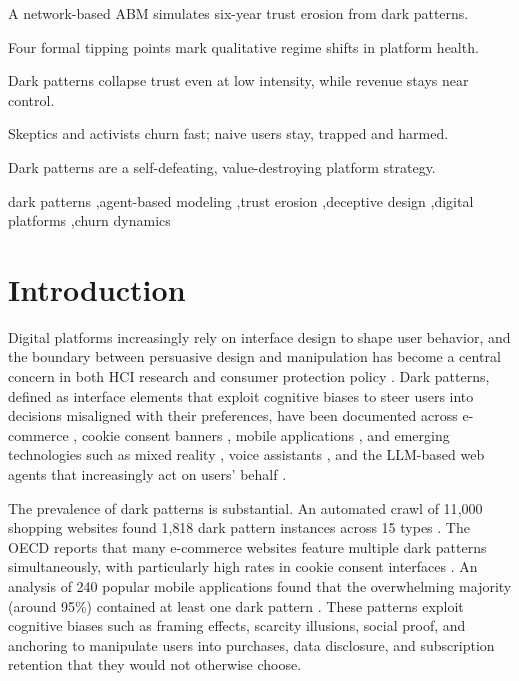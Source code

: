 \documentclass[a4paper,fleqn]{cas-sc}
\begin{document}
\begin{highlights}
\item A network-based ABM simulates six-year trust erosion from dark patterns.
\item Four formal tipping points mark qualitative regime shifts in platform health.
\item Dark patterns collapse trust even at low intensity, while revenue stays near control.
\item Skeptics and activists churn fast; naive users stay, trapped and harmed.
\item Dark patterns are a self-defeating, value-destroying platform strategy.
\end{highlights}

\begin{keywords}
dark patterns \sep agent-based modeling \sep trust erosion \sep deceptive design \sep digital platforms \sep churn dynamics
\end{keywords}

\maketitle

\section{Introduction}
Digital platforms increasingly rely on interface design to shape user behavior, and the boundary between persuasive design and manipulation has become a central concern in both HCI research and consumer protection policy \citep{gray2018,yi2025}. Dark patterns, defined as interface elements that exploit cognitive biases to steer users into decisions misaligned with their preferences, have been documented across e-commerce \citep{mathur2019}, cookie consent banners \citep{berens2024}, mobile applications \citep{gunawan2021}, and emerging technologies such as mixed reality \citep{meinhardt2025}, voice assistants \citep{deconca2023}, and the LLM-based web agents that increasingly act on users' behalf \citep{ersoy2026}.

The prevalence of dark patterns is substantial. An automated crawl of 11{,}000 shopping websites found 1{,}818 dark pattern instances across 15 types \citep{mathur2019}. The OECD reports that many e-commerce websites feature multiple dark patterns simultaneously, with particularly high rates in cookie consent interfaces \citep{oecd2022}. An analysis of 240 popular mobile applications found that the overwhelming majority (around 95\%) contained at least one dark pattern \citep{digeronimo2020}. These patterns exploit cognitive biases such as framing effects, scarcity illusions, social proof, and anchoring to manipulate users into purchases, data disclosure, and subscription retention that they would not otherwise choose.
\end{document}
